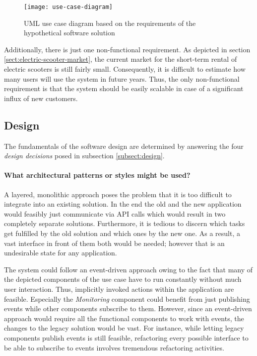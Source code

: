 \documentclass[12pt,a4paper]{report}
\begin{document}
\begin{figure}[htb]
\centering
\texttt{[image: use-case-diagram]}
\caption{UML use case diagram based on the requirements of the hypothetical software solution}
\label{fig:use-case-diagram}
\end{figure}

Additionally, there is just one non-functional requirement.
As depicted in section \ref{sect:electric-scooter-market}, the current market
for the short-term rental of electric scooters is still fairly small.
Consequently, it is difficult to estimate how many users will use the system
in future years. Thus, the only non-functional requirement is that the system
should be easily scalable in case of a significant influx of new customers.


\subsection{Design}

The fundamentals of the software design are determined by answering the four
\textit{design decisions} posed in subsection \ref{subsect:design}.

\paragraph{What architectural patterns or styles might be used?}
A layered, monolithic approach poses the problem that it is too difficult
to integrate into an existing solution. In the end the old and the new
application would feasibly just communicate via API calls which would result
in two completely separate solutions. Furthermore, it is tedious to discern
which tasks get fulfilled by the old solution and which ones by the new one.
As a result, a vast interface in front of them both would be needed;
however that is an undesirable state for any application.

The system could follow an event-driven approach owing to the fact that
many of the depicted components of the use case have to run constantly without
much user interaction. Thus, implicitly invoked actions within the application
are feasible. Especially the \textit{Monitoring} component could benefit from
just publishing events while other components subscribe to them.
However, since an event-driven approach would require all the
functional components to work with events, the changes to the legacy solution
would be vast. For instance, while letting legacy components publish events
is still feasible, refactoring every possible interface to be able
to subscribe to events involves tremendous refactoring activities.
\end{document}

